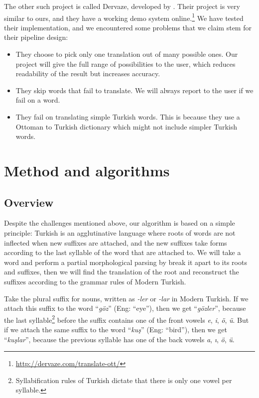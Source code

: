 \documentclass[10pt,twocolumn]{article}
\theoremstyle{nonumberplain}
\newcommand{\word}[1]{``\emph{#1}''}
\begin{document}
The other such project is called Dervaze, developed by \citet{dervaze}.
Their project is very similar to ours, and they have a working demo system
online.\footnote{\url{http://dervaze.com/translate-ott/}}
We have tested their implementation, and we encountered some problems that we claim stem for their pipeline design:
\begin{itemize}[noitemsep,topsep=0pt]
\item They choose to pick only one translation out of many possible ones. Our project will give the full range of possibilities to the user, which reduces readability of the result but increases accuracy.
\item They skip words that fail to translate. We will always report to the user if we fail on a word.
\item They fail on translating simple Turkish words. This is because they use a Ottoman to Turkish dictionary which might not include simpler Turkish words.
\end{itemize}

\section{Method and algorithms}

\subsection{Overview}

Despite the challenges mentioned above, our algorithm is based on a simple
principle: Turkish is an agglutinative language where roots of words are not
inflected when new suffixes are attached, and the new suffixes take forms
according to the last syllable of the word that are attached to. We will take a
word and perform a partial morphological parsing by break it apart to its roots
and suffixes, then we will find the translation of the root and reconstruct the
suffixes according to the grammar rules of Modern Turkish.

Take the plural suffix for nouns, written as \emph{-ler} or \emph{-lar} in Modern
Turkish. If we attach this suffix to the word \word{göz} (Eng: ``eye''),
then we get \word{gözler}, because the last syllable\footnote{Syllabification
rules of Turkish dictate that there is only one vowel per syllable.} before the
suffix contains one of the front vowels \emph{e}, \emph{i}, \emph{ö}, \emph{ü}.
But if we attach the same suffix to the word \word{kuş} (Eng: ``bird''),
then we get \word{kuşlar}, because the previous syllable has one of the back
vowels \emph{a}, \emph{ı}, \emph{ö}, \emph{ü}.
\end{document}
